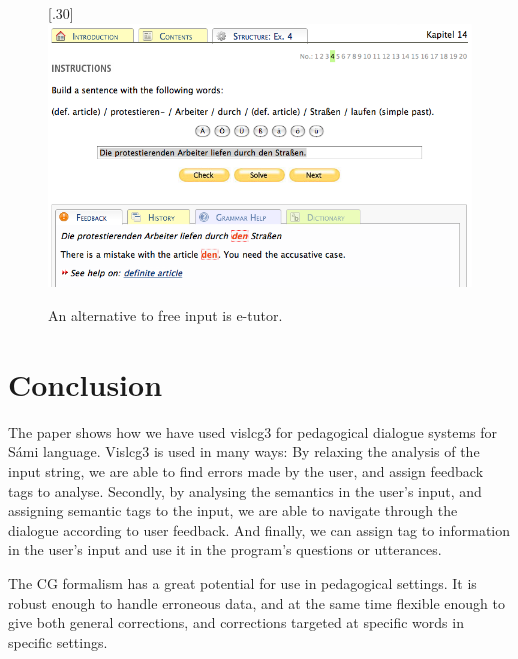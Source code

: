 \documentclass[11pt]{article}
\begin{document}
\vspace{0.7cm}
\begin{figure}[htbp]
\begin{center}
\scalebox{.30}[.30]{\includegraphics{presentation/img/e-tutor.png}}\\
\caption{An alternative to free input is e-tutor.}
\label{etutor}
\end{center}
\end{figure}

\section{Conclusion}

The paper shows how we have used vislcg3 for pedagogical dialogue systems for Sámi language. Vislcg3 is used in many ways: By relaxing the analysis of the input string, we are able to find errors made by the user, and assign feedback tags to analyse. Secondly, by analysing the semantics in the user's input, and assigning semantic tags to the input, we are able to navigate through the dialogue according to user feedback. And finally, we can assign tag to information in the user's input and use it in the program's questions or utterances.  

The CG formalism has a great potential for use in pedagogical settings.
It is robust enough to handle erroneous data, and at the same time flexible enough to give both general corrections, and corrections targeted at specific words in specific settings.
\end{document}
